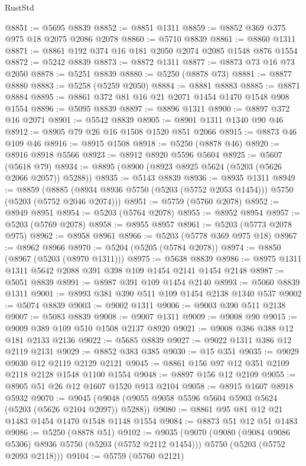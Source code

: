 \begin{lexlean}{RustStd}
\begin{coremodule}
@8851 := @5695 @8839
@8852 := @8851 @1311
@8859 := @8852 @369 @375 @975 @18 @2075 @2086 @2078
@8860 := @5710 @8839
@8861 := @8860 @1311
@8871 := @8861 @192 @374 @16 @181 @2050 @2074 @2085 @1548 @876 @1554
@8872 := @5242 @8839
@8873 := @8872 @1311
@8877 := @8873 @73 @16 @73 @2050
@8878 := @5251 @8839
@8880 := @5250 (@8878 @73)
@8881 := @8877 @8880
@8883 := @5258 (@5259 @2050)
@8884 := @8881 @8883
@8885 := @8871 @8884
@8895 := @8861 @372 @81 @16 @21 @2071 @1454 @1470 @1548 @908 @1554
@8896 := @5095 @8839
@8897 := @8896 @1311
@8900 := @8897 @372 @16 @2071
@8901 := @5542 @8839
@8905 := @8901 @1311 @1340 @90 @46
@8912 := @8905 @79 @26 @16 @1508 @1520 @851 @2066
@8915 := @8873 @46 @109 @46
@8916 := @8915 @1508
@8918 := @5250 (@8878 @46)
@8920 := @8916 @8918 @5566
@8923 := @8912 @8920 @5596 @5604
@8925 := @5607 (@5618 @79)
@8934 := @8895 (@8900 (@8923 @8925 @5624 (@5203 (@5626 @2066 @2057)) @5288))
@8935 := @5143 @8839
@8936 := @8935 @1311
@8949 := @8859
    (@8885 (@8934 @8936 @5750 (@5203 (@5752 @2053 @1454))) @5750 (@5203 (@5752 @2046 @2074)))
@8951 := @5759 (@5760 @2078)
@8952 := @8949 @8951
@8954 := @5203 (@5764 @2078)
@8955 := @8952 @8954
@8957 := @5203 (@5769 @2078)
@8958 := @8955 @8957
@8961 := @5203 (@5773 @2078 @975)
@8962 := @8958 @8961
@8966 := @5203 (@5778 @369 @975 @18)
@8967 := @8962 @8966
@8970 := @5204 (@5205 (@5784 @2078))
@8974 := @8850 (@8967 (@5203 (@8970 @1311)))
@8975 := @5638 @8839
@8986 := @8975 @1311 @1311 @5642 @2088 @391 @398 @109 @1454 @2141 @1454 @2148
@8987 := @5051 @8839
@8991 := @8987 @391 @109 @1454 @2140
@8993 := @5060 @8839 @1311
@9001 := @8993 @381 @390 @511 @109 @1454 @2138 @1340 @537
@9002 := @5074 @8839
@9003 := @9002 @1311
@9006 := @9003 @390 @511 @2138
@9007 := @5083 @8839
@9008 := @9007 @1311
@9009 := @9008 @90
@9015 := @9009 @389 @109 @510 @1508 @2137 @8920
@9021 := @9008 @386 @388 @12 @181 @2133 @2136
@9022 := @5685 @8839
@9027 := @9022 @1311 @386 @12 @2119 @2131
@9029 := @8852 @383 @385
@9030 := @15 @351
@9035 := @9029 @9030 @12 @2119 @2129 @2121
@9045 := @8861 @156 @97 @12 @351 @2109 @2118 @2128 @1548 @1100 @1554
@9048 := @8897 @156 @12 @2109
@9055 := @8905 @51 @26 @12 @1607 @1520 @913 @2104
@9058 := @8915 @1607 @8918 @5932
@9070 := @9045 (@9048 (@9055 @9058 @5596 @5604 @5903 @5624 (@5203 (@5626 @2104 @2097)) @5288))
@9080 := @8861 @95 @81 @12 @21 @1483 @1454 @1470 @1548 @1148 @1554
@9084 := @8873 @51 @12 @51 @1483
@9086 := @5250 (@8878 @51)
@9102 := @9035
    (@9070
      (@9080 (@9084 @9086 @5306) @8936 @5750 (@5203 (@5752 @2112 @1454)))
      @5750
      (@5203 (@5752 @2093 @2118)))
@9104 := @5759 (@5760 @2121)

\end{coremodule}
\end{lexlean}
